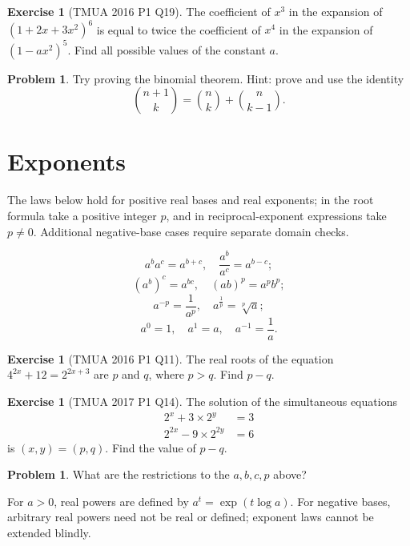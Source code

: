 \documentclass[11pt]{article}
\theoremstyle{definition}
\newtheorem{example}[theorem]{Exercise}
\newtheorem{problem}[theorem]{Problem}
\theoremstyle{remark}
\newcommand{\pqty}[1]{\left(#1\right)}
\begin{document}
\begin{example}[TMUA 2016 P1 Q19]\label{tmua-1-unit-006}
    The coefficient of \(x^3\) in the expansion of \(\pqty{1 + 2x + 3 x^2}^6\) is equal to twice the coefficient of \(x^4\) in the expansion of \(\pqty{1 - a x^2}^5\). Find all possible values of the constant \(a\).
\end{example}

\begin{problem}\label{tmua-1-unit-007}
    Try proving the binomial theorem. Hint: prove and use the identity
    \[
        \binom{n + 1}{k} = \binom{n}{k} + \binom{n}{k - 1}.
    \]  
\end{problem}

\section{Exponents}\label{tmua-1-section-002}
The laws below hold for positive real bases and real exponents; in the root formula take a positive integer \(p\), and in reciprocal-exponent expressions take \(p\ne0\). Additional negative-base cases require separate domain checks.

\[
    a^b a^c = a^{b + c}, \quad \frac{a^b}{a^c} = a^{b - c};
\]
\[
    \pqty{a^b}^c = a^{bc}, \quad \pqty{ab}^p = a^p b^p;
\]
\[
    a^{-p} = \frac{1}{a^p}, \quad a^{\frac{1}{p}} = \sqrt[p]{a};
\]
\[
    a^0 = 1, \quad a^1 = a, \quad a^{-1} = \frac{1}{a}.
\]

\begin{example}[TMUA 2016 P1 Q11]\label{tmua-1-unit-008}
    The real roots of the equation \(4^{2x} + 12 = 2^{2x + 3}\) are \(p\) and \(q\), where \(p > q\). Find \(p - q\).
\end{example}

\begin{example}[TMUA 2017 P1 Q14]\label{tmua-1-unit-009}
    The solution of the simultaneous equations
    \begin{align*}
        2^x + 3 \times 2^y &= 3 \\
        2^{2x} - 9 \times 2^{2y} &= 6
    \end{align*}
    is \(\pqty{x, y} = \pqty{p, q}\). Find the value of \(p - q\).
\end{example}

\begin{problem}\label{tmua-1-unit-010}
    What are the restrictions to the \(a, b, c, p\) above?
\end{problem}

For \(a>0\), real powers are defined by \(a^t=\exp(t\log a)\). For negative bases, arbitrary real powers need not be real or defined; exponent laws cannot be extended blindly.
\end{document}
